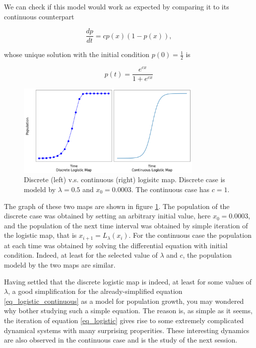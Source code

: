 We can check if this model would work as expected by comparing it to its continuous counterpart 

\begin{equation}\label{eq_logistic_continuous}
	\frac{dp}{dt} = c p(x) (1-p(x)),
\end{equation}

whose unique solution with the initial condition $p(0) = \frac{1}{2}$ is 

$$
p(t) = \frac{e^{cx}}{1+e^{cx}}
$$

\begin{figure}[b!]
	\centering
	\includegraphics[width=0.8\textwidth]{./figures/con_vs_discrete_logistic_map.png}
	\caption{Discrete (left) v.s. continuous (right) logisitc map. Discrete case is modeld by $\lambda = 0.5$ and $x_0 = 0.0003$. The continuous case has $c=1$.}
	\label{fig:con_vs_discrete}
\end{figure}

The graph of these two maps are shown in figure \ref{fig:con_vs_discrete}.
The population of the discrete case was obtained by setting an arbitrary initial value, here $x_0 = 0.0003$, and the population of the next time interval was obtained by simple iteration of the logistic map, that is $x_{i+1} = L_{\lambda}(x_i)$.
For the continuous case the population at each time was obtained by solving the differential equation with initial condition.
Indeed, at least for the selected value of $\lambda$ and $c$, the population modeld by the two maps are similar.

Having settled that the discrete logistic map is indeed, at least for some values of $\lambda$, a good simplification for the already-simplified equation \ref{eq_logistic_continuous} as a model for population growth, you may wondered why bother studying such a simple equation. 
The reason is, as simple as it seems, the iteration of equation \ref{eq_logistic} gives rise to some extremely complicated dynamical systems with many surprising properities. 
These interesting dynamics are also observed in the continuous case and is the study of the next session.

